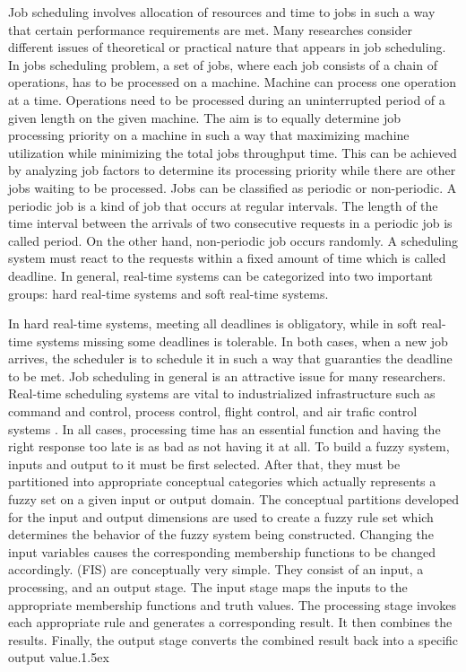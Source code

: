 \documentclass[a4paper,12pt]{report}
\begin{document}
{{{{		\linespread{1.5}
	Job scheduling involves allocation of resources and time to jobs in such a way that certain performance requirements are met. Many researches consider different issues of theoretical or practical nature that appears in job scheduling. In jobs scheduling problem, a set of jobs, where each job consists of a chain of operations, has to be processed on a machine. Machine can process one operation at a time. Operations need to be processed during an uninterrupted period of a given length on the given machine. The aim is to equally determine job processing priority on a machine in such a way that maximizing machine utilization while minimizing the total jobs throughput time. This can be achieved by analyzing job factors to determine its processing priority while there are other jobs waiting to be processed. Jobs can be classified as periodic or non-periodic. A periodic job is a kind of job that occurs at regular intervals. The length of the time interval between the arrivals of two consecutive requests in a periodic job is called period. On the other hand, non-periodic job occurs randomly. A scheduling system must react to the requests within a fixed amount of time which is called deadline. In general, real-time systems can be categorized into two important groups: hard real-time systems and soft real-time systems.
	\par In hard real-time systems, meeting all deadlines is obligatory, while in soft real-time systems missing some deadlines is tolerable. In both cases, when a new job arrives, the scheduler is to schedule it in such a way that guaranties the deadline to be met. Job scheduling in general is an attractive issue for many researchers. Real-time scheduling systems are vital to industrialized infrastructure such as command and control, process control, flight control, and air trafic control systems . In all cases, processing time has an essential function and having the right response too late is as bad as not having it at all.
	To build a fuzzy system, inputs and output to it must be first selected. After that, they must be partitioned into appropriate conceptual categories which actually represents a fuzzy set on a given input or output domain. The conceptual partitions developed for the input and output dimensions are used to create a fuzzy rule set which determines the behavior of the fuzzy system being constructed. Changing the input variables causes the corresponding membership functions to be changed accordingly. (FIS) are conceptually very simple. They consist of an input, a processing, and an output stage. The input stage maps the inputs to the appropriate membership functions and truth values. The processing stage invokes each appropriate rule and generates a corresponding result. It then combines the results. Finally, the output stage converts the combined result back into a specific output value.\parskip 1.5ex

}}}}
\end{document}
